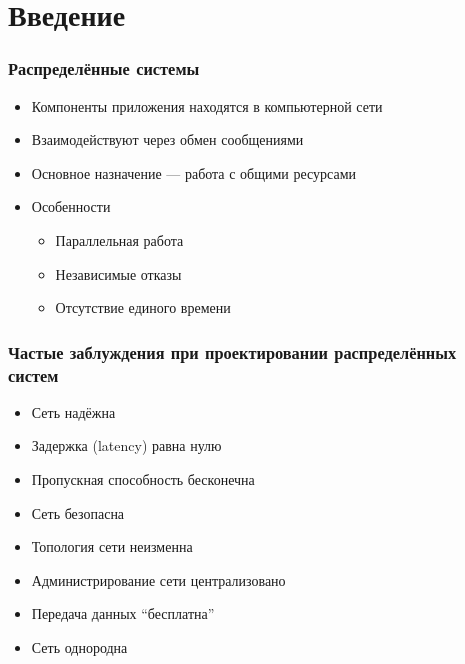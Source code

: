 \documentclass{../../slides-style}
\begin{document}
    
    \begin{frame}[plain]
        \titlepage
    \end{frame}

    \section{Введение}

    \begin{frame}
        \frametitle{Распределённые системы}
        \begin{itemize}
            \item Компоненты приложения находятся в компьютерной сети
            \item Взаимодействуют через обмен сообщениями
            \item Основное назначение --- работа с общими ресурсами
            \item Особенности
            \begin{itemize}
                \item Параллельная работа
                \item Независимые отказы
                \item Отсутствие единого времени
            \end{itemize}
        \end{itemize}
    \end{frame}

    \begin{frame}
        \frametitle{Частые заблуждения при проектировании распределённых систем}
        \begin{itemize}
            \item Сеть надёжна
            \item Задержка (latency) равна нулю
            \item Пропускная способность бесконечна
            \item Сеть безопасна
            \item Топология сети неизменна
            \item Администрирование сети централизовано
            \item Передача данных ``бесплатна''
            \item Сеть однородна
        \end{itemize}
    \end{frame}
\end{document}
